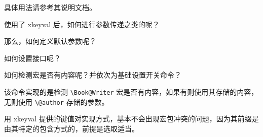   具体用法请参考其说明文档。

  使用了 xkeyval 后，如何进行参数传递之类的呢？
\begin{texlist}
  \ProcessOptionsX\relax
\end{texlist}

  那么，如何定义默认参数呢？
\begin{texlist}
\end{texlist}

  如何设置接口呢？
\begin{texlist}
  \newcommand{\HTset}[1]{\setkeys{HTNotes.cls}{#1}}
\end{texlist}

  如何检测宏是否有内容呢？并依次为基础设置开关命令？
\begin{texlist}
  \ifdefempty{\Book@Writer}{\@author}{\Book@Writer}
\end{texlist}
  该命令实现的是检测 \verb|\Book@Writer| 宏是否有内容，如果有则使用其存储的内容，无则使用 \verb|\@author| 存储的参数。

  用 xkeyval 提供的键值对实现方式，基本不会出现宏包冲突的问题，因为其前缀是由其特定的包含方式的，前提是选取适当。
